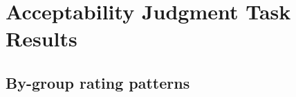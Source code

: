 
\chapter{Acceptability Judgment Task Results}\label{app-results-ajt}

\vspace{-3pt}

\section{By-group rating patterns}\label{app-ajt-rating}



